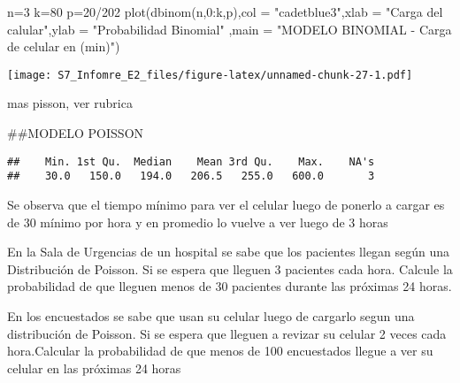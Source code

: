 \documentclass[
]{article}
\newenvironment{Shaded}{\begin{snugshade}}{\end{snugshade}}
\newcommand{\AttributeTok}[1]{\textcolor[rgb]{0.77,0.63,0.00}{#1}}
\newcommand{\ConstantTok}[1]{\textcolor[rgb]{0.00,0.00,0.00}{#1}}
\newcommand{\DecValTok}[1]{\textcolor[rgb]{0.00,0.00,0.81}{#1}}
\newcommand{\FunctionTok}[1]{\textcolor[rgb]{0.00,0.00,0.00}{#1}}
\newcommand{\NormalTok}[1]{#1}
\newcommand{\OtherTok}[1]{\textcolor[rgb]{0.56,0.35,0.01}{#1}}
\newcommand{\SpecialCharTok}[1]{\textcolor[rgb]{0.00,0.00,0.00}{#1}}
\newcommand{\StringTok}[1]{\textcolor[rgb]{0.31,0.60,0.02}{#1}}
\begin{document}
\begin{Shaded}
\begin{Highlighting}[]
\NormalTok{n}\OtherTok{=}\DecValTok{3}
\NormalTok{k}\OtherTok{=}\DecValTok{80}
\NormalTok{p}\OtherTok{=}\DecValTok{20}\SpecialCharTok{/}\DecValTok{202}
\FunctionTok{plot}\NormalTok{(}\FunctionTok{dbinom}\NormalTok{(n,}\DecValTok{0}\SpecialCharTok{:}\NormalTok{k,p),}\AttributeTok{col =} \StringTok{"cadetblue3"}\NormalTok{,}\AttributeTok{xlab =} \StringTok{"Carga del calular"}\NormalTok{,}\AttributeTok{ylab =} \StringTok{"Probabilidad Binomial"}\NormalTok{ ,}\AttributeTok{main =} \StringTok{"MODELO BINOMIAL {-} Carga de celular en (min)"}\NormalTok{)}
\end{Highlighting}
\end{Shaded}

\texttt{[image: S7\_Infomre\_E2\_files/figure-latex/unnamed-chunk-27-1.pdf]}

mas pisson, ver rubrica

\#\#MODELO POISSON

\begin{Shaded}
\end{Shaded}

\begin{verbatim}
##    Min. 1st Qu.  Median    Mean 3rd Qu.    Max.    NA's 
##    30.0   150.0   194.0   206.5   255.0   600.0       3
\end{verbatim}

Se observa que el tiempo mínimo para ver el celular luego de ponerlo a
cargar es de 30 mínimo por hora y en promedio lo vuelve a ver luego de 3
horas

En la Sala de Urgencias de un hospital se sabe que los pacientes llegan
según una Distribución de Poisson. Si se espera que lleguen 3 pacientes
cada hora. Calcule la probabilidad de que lleguen menos de 30 pacientes
durante las próximas 24 horas.

En los encuestados se sabe que usan su celular luego de cargarlo segun
una distribución de Poisson. Si se espera que lleguen a revizar su
celular 2 veces cada hora.Calcular la probabilidad de que menos de 100
encuestados llegue a ver su celular en las próximas 24 horas
\end{document}
